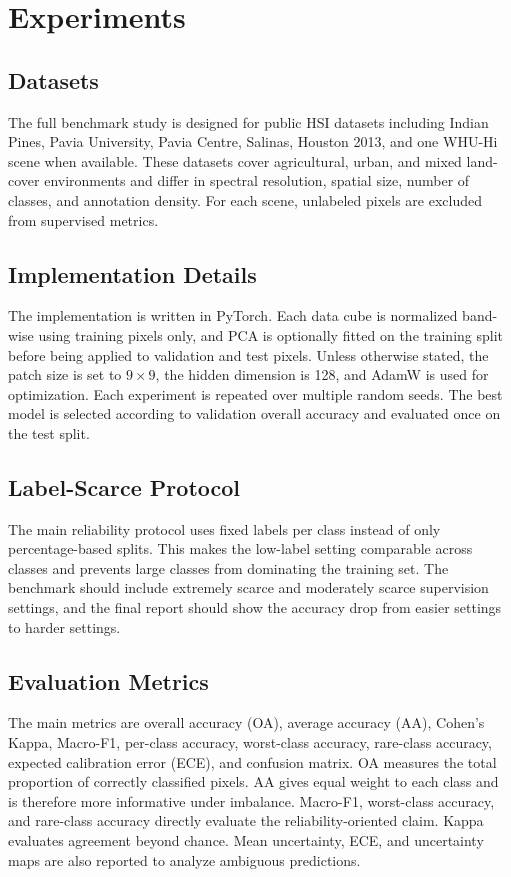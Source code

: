 \section{Experiments}
\subsection{Datasets}
The full benchmark study is designed for public HSI datasets including Indian Pines, Pavia University, Pavia Centre, Salinas, Houston 2013, and one WHU-Hi scene when available. These datasets cover agricultural, urban, and mixed land-cover environments and differ in spectral resolution, spatial size, number of classes, and annotation density. For each scene, unlabeled pixels are excluded from supervised metrics.

\subsection{Implementation Details}
The implementation is written in PyTorch. Each data cube is normalized band-wise using training pixels only, and PCA is optionally fitted on the training split before being applied to validation and test pixels. Unless otherwise stated, the patch size is set to $9\times9$, the hidden dimension is 128, and AdamW is used for optimization. Each experiment is repeated over multiple random seeds. The best model is selected according to validation overall accuracy and evaluated once on the test split.

\subsection{Label-Scarce Protocol}
The main reliability protocol uses fixed labels per class instead of only percentage-based splits. This makes the low-label setting comparable across classes and prevents large classes from dominating the training set. The benchmark should include extremely scarce and moderately scarce supervision settings, and the final report should show the accuracy drop from easier settings to harder settings.

\subsection{Evaluation Metrics}
The main metrics are overall accuracy (OA), average accuracy (AA), Cohen's Kappa, Macro-F1, per-class accuracy, worst-class accuracy, rare-class accuracy, expected calibration error (ECE), and confusion matrix. OA measures the total proportion of correctly classified pixels. AA gives equal weight to each class and is therefore more informative under imbalance. Macro-F1, worst-class accuracy, and rare-class accuracy directly evaluate the reliability-oriented claim. Kappa evaluates agreement beyond chance. Mean uncertainty, ECE, and uncertainty maps are also reported to analyze ambiguous predictions.

